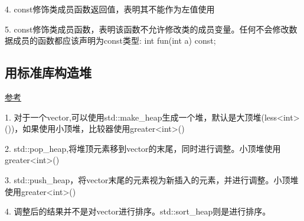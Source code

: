 4. const修饰类成员函数返回值，表明其不能作为左值使用

5. const修饰类成员函数，表明该函数不允许修改类的成员变量。任何不会修改数据成员的函数都应该声明为const类型: int fun(int a) const;

\subsection{用标准库构造堆}
\href{http://www.cplusplus.com/reference/algorithm/make_heap/?kw=make_heap}{参考}

1. 对于一个vector,可以使用std::make_heap生成一个堆，默认是大顶堆(less<int>())，如果使用小顶堆，比较器使用greater<int>()

2. std::pop_heap,将堆顶元素移到vector的末尾，同时进行调整。小顶堆使用greater<int>()

3. std::push_heap，将vector末尾的元素视为新插入的元素，并进行调整。小顶堆使用greater<int>()

4. 调整后的结果并不是对vector进行排序。std::sort_heap则是进行排序。